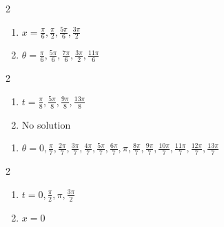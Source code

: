 \documentclass{ximera}
\begin{document}
\begin{multicols}{2}

\begin{enumerate}

\setcounter{enumi}{\value{HW}}

\item $x = \frac{\pi}{6}, \frac{\pi}{2}, \frac{5\pi}{6}, \frac{3\pi}{2}$
\item $\theta = \frac{\pi}{6}, \frac{5\pi}{6}, \frac{7\pi}{6}, \frac{3\pi}{2}, \frac{11\pi}{6}$

\setcounter{HW}{\value{enumi}}

\end{enumerate}

\end{multicols}

\begin{multicols}{2}

\begin{enumerate}

\setcounter{enumi}{\value{HW}}

\item $t = \frac{\pi}{8}, \frac{5\pi}{8}, \frac{9\pi}{8}, \frac{13\pi}{8}$
\item No solution 

\setcounter{HW}{\value{enumi}}

\end{enumerate}

\end{multicols}

\begin{enumerate}

\setcounter{enumi}{\value{HW}}

\item $\theta = 0, \frac{\pi}{7}, \frac{2\pi}{7}, \frac{3\pi}{7}, \frac{4\pi}{7}, \frac{5\pi}{7}, \frac{6\pi}{7}, \pi, \frac{8\pi}{7}, \frac{9\pi}{7}, \frac{10\pi}{7}, \frac{11\pi}{7}, \frac{12\pi}{7}, \frac{13\pi}{7}$

\setcounter{HW}{\value{enumi}}

\end{enumerate}

\begin{multicols}{2}

\begin{enumerate}

\setcounter{enumi}{\value{HW}}

\item  $t=0, \frac{\pi}{2}, \pi, \frac{3\pi}{2}$

\item $x = 0$ 

\setcounter{HW}{\value{enumi}}

\end{enumerate}

\end{multicols}
\end{document}
